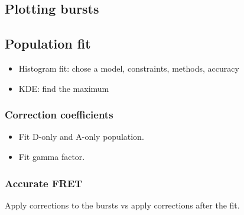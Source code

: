 \subsection{Plotting bursts}

\subsection{Population fit}

\begin{itemize}
\item Histogram fit: chose a model, constraints, methods, accuracy
\item KDE: find the maximum
\end{itemize}

\subsubsection{Correction coefficients}


\begin{itemize}
\item Fit D-only and A-only population.
\item Fit gamma factor.
\end{itemize}


\subsubsection{Accurate FRET}

Apply corrections to the bursts vs apply corrections after the fit.

